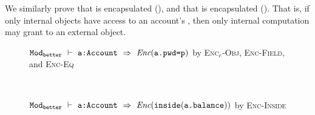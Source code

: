 We similarly prove that  {is encapsulated} (\textbf{}), and
that  {is encapsulated} (\textbf{}). 
That is, if only internal objects have access
to an account's , then only internal computation may grant 
 to an external object.

\begin{figure}[h]
\begin{proofexample}
		{\proofstepwithrule
			{
			${\texttt{Mod}}_{{\texttt{better}}}\ \vdash\ {\texttt{a:Account}}\ \Rightarrow\ \textit{Enc}({\texttt{a.pwd=p}})$
			}{by \textsc{Enc$_e$-Obj}, \textsc{Enc-Field}, and \textsc{Enc-Eq}}}
\endproofsteps
\end{proofexample}
\\\begin{proofexample}
		{\proofstepwithrule
			{
			${\texttt{Mod}}_{{\texttt{better}}}\ \vdash\ {\texttt{a:Account}}\ \Rightarrow\ \textit{Enc}(\texttt{inside}( {\texttt{a.balance}} ))$
			}{by \textsc{Enc-Inside}}}
\endproofsteps
\end{proofexample}
\end{figure}

